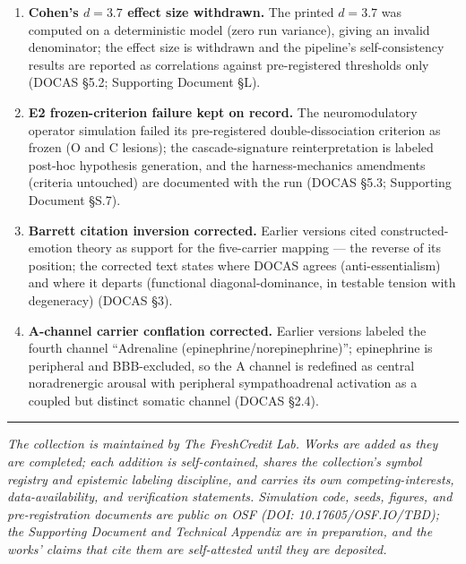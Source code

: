 \documentclass[11pt]{article}
\begin{document}
\begin{enumerate}
must be printed in the Supporting Document (SIM-R2 battery 3; GTT \S{}3.1,
\S{}7(viii)).
\item \textbf{Cohen's $d = 3.7$ effect size withdrawn.} The printed $d = 3.7$
was computed on a deterministic model (zero run variance), giving an invalid
denominator; the effect size is withdrawn and the pipeline's self-consistency
results are reported as correlations against pre-registered thresholds only
(DOCAS \S{}5.2; Supporting Document \S{}L).
\item \textbf{E2 frozen-criterion failure kept on record.} The neuromodulatory
operator simulation failed its pre-registered double-dissociation criterion as
frozen (O and C lesions); the cascade-signature reinterpretation is labeled
post-hoc hypothesis generation, and the harness-mechanics amendments
(criteria untouched) are documented with the run (DOCAS \S{}5.3; Supporting Document \S{}S.7).
\item \textbf{Barrett citation inversion corrected.} Earlier versions cited
constructed-emotion theory as support for the five-carrier mapping --- the
reverse of its position; the corrected text states where DOCAS agrees
(anti-essentialism) and where it departs (functional diagonal-dominance, in
testable tension with degeneracy) (DOCAS \S{}3).
\item \textbf{A-channel carrier conflation corrected.} Earlier versions labeled
the fourth channel ``Adrenaline (epinephrine/norepinephrine)''; epinephrine is
peripheral and BBB-excluded, so the A channel is redefined as central
noradrenergic arousal with peripheral sympathoadrenal activation as a coupled
but distinct somatic channel (DOCAS \S{}2.4).
\end{enumerate}

\vspace{1.2em}
\begin{center}\rule{0.32\textwidth}{0.4pt}\end{center}
\vspace{0.6em}

\noindent\emph{The collection is maintained by The FreshCredit Lab. Works are
added as they are completed; each addition is self-contained, shares the
collection's symbol registry and epistemic labeling discipline, and carries its
own competing-interests, data-availability, and verification statements.
Simulation code, seeds, figures, and pre-registration documents are public on OSF (DOI: 10.17605/OSF.IO/TBD); the Supporting Document and Technical Appendix are in preparation, and the works' claims that cite them are self-attested until they are deposited.}
\end{document}
